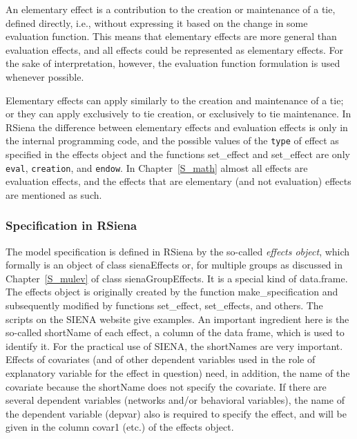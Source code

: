 \documentclass[a4paper,fleqn,11pt]{article}
\newcommand{\+}{\, + \,}
\newcommand{\sfn}[1]{\textsf{#1}}
\newcommand{\RS}{{\sf \textsf{RSiena} }}
\newcommand{\SI}{{\sf SIENA }}
\newcommand{\si}{{\sf SIENA}}
\begin{document}
An elementary effect is a contribution to the creation or maintenance of a tie,
defined directly, i.e., without expressing it based on the
change in some evaluation function.
This means that elementary effects are more general than
evaluation effects, and all effects could be represented as elementary effects.
For the sake of interpretation, however, the evaluation function formulation
is used whenever possible.

Elementary effects can apply similarly to the creation and maintenance of a tie;
or they can apply exclusively to tie creation, or exclusively to tie
maintenance. In \RS the difference between elementary effects and evaluation effects
is only in the internal programming code, and the
possible values of the \texttt{type} of effect
as specified in the effects object and the
functions \sfn{set\_effect} and \sfn{set\_effect}
are only \texttt{eval}, \texttt{creation}, and \texttt{endow}.
In Chapter~\ref{S_math} almost all effects are evaluation effects,
and the effects that are elementary (and not evaluation) effects
are mentioned as such.

\subsubsection{Specification in \RS}

The model specification is defined in \RS by the so-called
\emph{effects object}, which formally is an object of class
\sfn{sienaEffects} or, for multiple groups as discussed in Chapter~\ref{S_mulev}
of class \sfn{sienaGroupEffects}.
It is a special kind of \sfn{data.frame}.
The effects object is originally created by the function \textsf{make\_specification} and
subsequently modified by functions \sfn{set\_effect},
\sfn{set\_effects}, and others.
The scripts on the \SI website give examples.
An important ingredient here is the so-called \sfn{shortName}
of each effect, a column of the data frame, which is used to identify it.
For the practical use of \si, the \sfn{shortName}s are very important.
Effects of covariates (and of other dependent variables used in
the role of explanatory variable for the effect in question)
need, in addition, the name of the covariate
because the \sfn{shortName} does not specify the covariate.
If there are several dependent variables (networks and/or behavioral variables),
the name of the dependent variable (\sfn{depvar}) also is required
to specify the effect, and will be given in the column \sfn{covar1}
(etc.) of the effects object.
\end{document}

